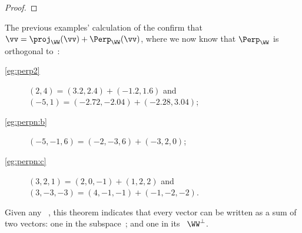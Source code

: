\begin{proof}
%
\end{proof}


\begin{example} 
The previous examples' calculation of the  confirm that \(\vv=\proj_\WW(\vv)+\Perp_\WW(\vv)\), where we now know that \(\Perp_\WW\) is orthogonal to~\WW:
\begin{description}
\item[\cref{eg:perp2}] \((2,4)=(3.2,2.4)+(-1.2,1.6)\) and 
\\\((-5,1)=(-2.72,-2.04)+(-2.28,3.04)\);
\item[\cref{eg:perpn:b}] \((-5,-1,6)=(-2,-3,6)+(-3,2,0)\);
\item[\cref{eg:perpn:c}] \((3,2,1)=(2,0,-1)+(1,2,2)\) and 
\\\((3,-3,-3)=(4,-1,-1)+(-1,-2,-2)\).
\end{description}
\end{example}

Given any ~\WW, this theorem indicates that every vector can be written as a sum of two vectors: one in the subspace~\WW; and one in its ~\(\WW^\perp\).


